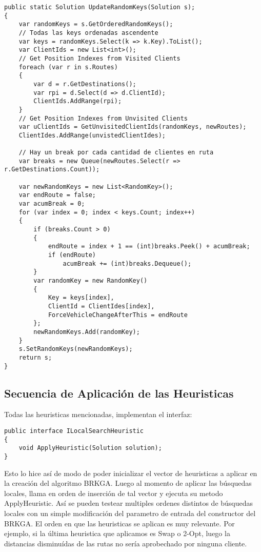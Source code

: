\begin{lstlisting}
public static Solution UpdateRandomKeys(Solution s);
{
	var randomKeys = s.GetOrderedRandomKeys();
	// Todas las keys ordenadas ascendente
	var keys = randomKeys.Select(k => k.Key).ToList();
	var ClientIds = new List<int>();
	// Get Position Indexes from Visited Clients
	foreach (var r in s.Routes)
	{
		var d = r.GetDestinations();
		var rpi = d.Select(d => d.ClientId);
		ClientIds.AddRange(rpi);
	}
	// Get Position Indexes from Unvisited Clients
	var uClientIds = GetUnvisitedClientIds(randomKeys, newRoutes);
	ClientIdes.AddRange(unvistedClientIdes);

	// Hay un break por cada cantidad de clientes en ruta 
	var breaks = new Queue(newRoutes.Select(r => r.GetDestinations.Count));

	var newRandomKeys = new List<RandomKey>();
	var endRoute = false;
	var acumBreak = 0;
	for (var index = 0; index < keys.Count; index++)
	{
		if (breaks.Count > 0)
		{		
			endRoute = index + 1 == (int)breaks.Peek() + acumBreak;
			if (endRoute)
				acumBreak += (int)breaks.Dequeue();
		}		
		var randomKey = new RandomKey()
		{
			Key = keys[index],
			ClientId = ClientIdes[index],
			ForceVehicleChangeAfterThis = endRoute
		};
		newRandomKeys.Add(randomKey);
	}
	s.SetRandomKeys(newRandomKeys);
	return s;
}
\end{lstlisting}

\subsection{Secuencia de Aplicación de las Heuristicas}

Todas las heuristicas mencionadas, implementan el interfaz:

\begin{lstlisting}
public interface ILocalSearchHeuristic
{
	void ApplyHeuristic(Solution solution);
}
\end{lstlisting}

Esto lo hice así de modo de poder inicializar el vector de heuristicas a aplicar en la creación del algoritmo BRKGA. Luego al momento de aplicar las búsquedas locales, llama en orden de inserción de tal vector y ejecuta su metodo ApplyHeuristic. Así se pueden testear multiples ordenes distintos de búsquedas locales con un simple modificación del parametro de entrada del constructor del BRKGA. El orden en que las heuristicas se aplican es muy relevante. Por ejemplo, si la última heuristica que aplicamos es Swap o 2-Opt, luego la distancias disminuídas de las rutas no sería aprobechado por ninguna cliente.

